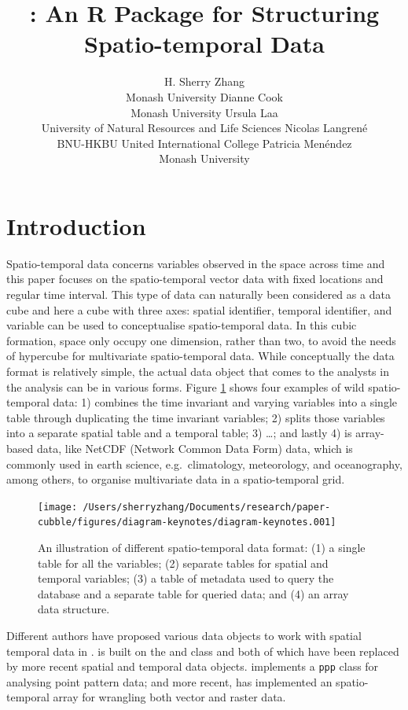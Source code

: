 \documentclass[
]{jss}
\author{
H. Sherry Zhang\\Monash University \And Dianne Cook\\Monash University
\AND Ursula Laa\\University of Natural Resources and Life Sciences
\AND Nicolas Langrené\\BNU-HKBU United International College
\AND Patricia Menéndez\\Monash University \AND
}
\title{\pkg{cubble}: An R Package for Structuring Spatio-temporal Data}
\begin{document}
\newpage

\hypertarget{introduction}{%
\section{Introduction}\label{introduction}}

Spatio-temporal data concerns variables observed in the space across
time and this paper focuses on the spatio-temporal vector data with
fixed locations and regular time interval. This type of data can
naturally been considered as a data cube and here a cube with three
axes: spatial identifier, temporal identifier, and variable can be used
to conceptualise spatio-temporal data. In this cubic formation, space
only occupy one dimension, rather than two, to avoid the needs of
hypercube for multivariate spatio-temporal data. While conceptually the
data format is relatively simple, the actual data object that comes to
the analysts in the analysis can be in various forms. Figure
\ref{fig:illu-input} shows four examples of wild spatio-temporal data:
1) combines the time invariant and varying variables into a single table
through duplicating the time invariant variables; 2) splits those
variables into a separate spatial table and a temporal table; 3) \ldots;
and lastly 4) is array-based data, like NetCDF (Network Common Data
Form) data, which is commonly used in earth science, e.g.~climatology,
meteorology, and oceanography, among others, to organise multivariate
data in a spatio-temporal grid.

\begin{CodeChunk}
\begin{figure}

{\centering \texttt{[image: /Users/sherryzhang/Documents/research/paper-cubble/figures/diagram-keynotes/diagram-keynotes.001]} 

}

\caption[An illustration of different spatio-temporal data format]{An illustration of different spatio-temporal data format: (1) a single table for all the variables; (2) separate tables for spatial and temporal variables; (3) a table of metadata used to query the database and a separate table for queried data; and (4) an array data structure.}\label{fig:illu-input}
\end{figure}
\end{CodeChunk}

Different authors have proposed various data objects to work with
spatial temporal data in .  \citep{spacetime}
is built on the  \citep{sp} and  \citep{xts} class and
both of which have been replaced by more recent spatial and temporal
data objects.  \citep{spatstat} implements a \texttt{ppp}
class for analysing point pattern data; and more recent, 
\citep{stars} has implemented an spatio-temporal array for wrangling
both vector and raster data.
\end{document}
